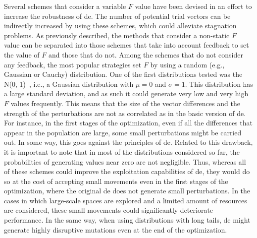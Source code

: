 \documentclass[review,3p]{elsarticle}
\newcommand{\DE}{{\sc de}}
\begin{document}
Several schemes that consider a variable $F$ value have been devised in an effort to increase the robustness of \DE{}. %
%
The number of potential trial vectors can be indirectly increased by using these schemes, which could alleviate
stagnation problems.
%
As previously described, the methods that consider a non-static $F$ value can be separated into those schemes that take into account
feedback to set the value of $F$ and those that do not.
%
Among the schemes that do not consider any feedback, the most popular
strategies set $F$ by using a random (e.g., Gaussian or Cauchy) distribution.
%
One of the first distributions tested was the N(0, 1)~\cite{Abbass:02}, i.e., a Gaussian distribution with $\mu = 0$ and $\sigma = 1$.
%
This distribution has a large standard deviation, and as such it could generate very low and very high $F$ values frequently.
%
This means that the size of the vector differences and the strength of the perturbations
are not as correlated as in the basic version of \DE{}.
%
For instance, in the first stages of the optimization, even if all the differences that appear in the population are large,
some small perturbations might be carried out.
%
In some way, this goes against the principles of \DE{}.
%
Related to this drawback, it is important to note that in most of the distributions considered so far,
the probabilities of generating values near zero are not negligible.
%
Thus, whereas all of these schemes could improve the exploitation capabilities of \DE{}, they would do so at the cost of accepting
small movements even in the first stages of the optimization, where the original \DE{} does not generate small
perturbations.
%
%
In the cases in which large-scale spaces are explored and a limited amount of resources are considered, these small movements
could significantly deteriorate performance.
%
In the same way, when using distributions with long tails, 
%
%
%
%
\DE{} might generate highly disruptive mutations even at the end of the optimization. %
\end{document}
